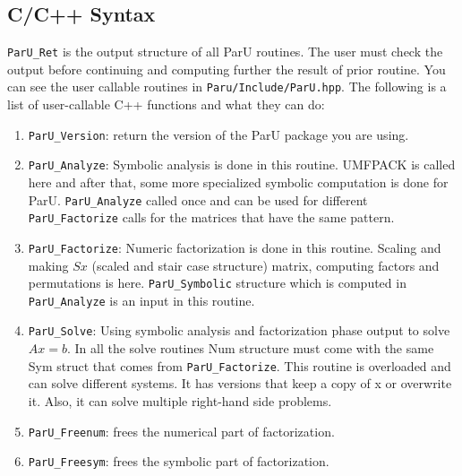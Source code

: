 \documentclass[12pt]{article}
\begin{document}
\subsection{C/C++ Syntax}
\verb'ParU_Ret' is the output structure of all ParU routines. The user must 
check the output before continuing and computing further the result of prior
routine. You can see the user callable routines in 
\verb'Paru/Include/ParU.hpp'.
The following is a list of user-callable C++ functions and what they
can do:

\begin{enumerate}

    \item \verb'ParU_Version': return the version of the ParU package 
        you are using.

    \item \verb'ParU_Analyze': Symbolic analysis is done in this routine. 
        UMFPACK is called here and after that, some more specialized symbolic
        computation is done for ParU. 
        \verb'ParU_Analyze' called once and can be used for different 
        \verb'ParU_Factorize' calls for the matrices that have the same pattern.
    \item \verb'ParU_Factorize': 
        Numeric factorization is done in this routine. Scaling and
        making $Sx$ (scaled and stair case structure) matrix, computing factors 
        and permutations is here. \verb'ParU_Symbolic' structure which is 
        computed in \verb'ParU_Analyze' is an input in this routine.

    \item \verb'ParU_Solve':  
        Using symbolic analysis and factorization phase output to solve $Ax=b$.
        In all the solve routines Num structure must come with the same 
        Sym struct that comes from \verb'ParU_Factorize'. 
        This routine is overloaded and can solve different systems. It has 
        versions that keep a copy of x or overwrite it. Also, it can solve 
        multiple right-hand side problems.

    \item \verb'ParU_Freenum':  frees the numerical part of factorization.


    \item \verb'ParU_Freesym':  frees the symbolic part of factorization.

\end{enumerate}
\end{document}
